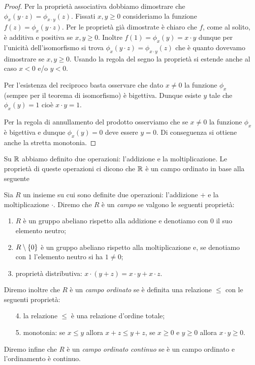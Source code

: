 \begin{proof}
Per la proprietà associativa dobbiamo dimostrare che 
$\phi_x(y\cdot z) = \phi_{x\cdot y}(z)$.
Fissati $x,y\ge 0$ consideriamo 
la funzione $f(z) = \phi_x(y\cdot z)$.
Per le proprietà già dimostrate è chiaro 
che $f$, come al solito, è additiva e positiva
se $x,y\ge 0$.
Inoltre $f(1) = \phi_x(y) = x\cdot y$ 
dunque per l'unicità dell'isomorfismo si 
trova $\phi_x(y\cdot z) = \phi_{x\cdot y}(z)$
che è quanto dovevamo dimostrare se $x,y\ge 0$.
Usando la regola del segno la proprietà si estende 
anche al caso $x<0$ e/o $y<0$.

Per l'esistenza del reciproco basta osservare 
che dato $x\neq 0$ la funzione $\phi_x$ 
(sempre per il teorema di isomorfismo) è 
bigettiva. Dunque esiste $y$ tale che $\phi_x(y)=1$
cioè $x\cdot y = 1$.

Per la regola di annullamento del prodotto osserviamo che 
se $x\neq 0$ la funzione $\phi_x$ è bigettiva 
e dunque $\phi_x(y)=0$ deve essere $y=0$.
Di conseguenza si ottiene anche la stretta monotonia.
\end{proof}

Su ${\mathbb R}$ abbiamo definito due operazioni: l'addizione e la moltiplicazione.
Le proprietà di queste operazioni ci dicono che ${\mathbb R}$ 
è un campo ordinato in base alla seguente

\begin{definition}[campo]
  \label{def:campo}%
Sia $R$ un insieme su cui sono definite due operazioni: l'addizione $+$ e la moltiplicazione $\cdot$.
Diremo che $R$ è un \emph{campo}
se valgono le seguenti proprietà:
\begin{enumerate}
  \item $R$ è un gruppo abeliano rispetto alla addizione e denotiamo con $0$ il suo elemento neutro;
  \item $R\setminus{\left\{ 0 \right\}}$ è un gruppo abeliano rispetto alla moltiplicazione e,
  se denotiamo con $1$ l'elemento neutro si ha $1\neq 0$;
  \item proprietà distributiva: $x\cdot(y+z) = x\cdot y + x\cdot z$.
\end{enumerate}

Diremo inoltre che $R$ 
è un \emph{campo ordinato}
se è definita una relazione $\le$ 
con le seguenti proprietà:
\begin{enumerate}
  \item[4.] la relazione $\le$ è una relazione d'ordine totale;
  \item[5.] monotonia: 
  se $x\le y$ allora $x+z\le y+z$, 
  se $x\ge 0$ e $y\ge 0$ allora $x\cdot y \ge 0$.
\end{enumerate} 

Diremo infine che $R$ è un \emph{campo ordinato continuo} se è un campo ordinato 
e l'ordinamento è continuo.
\end{definition}

